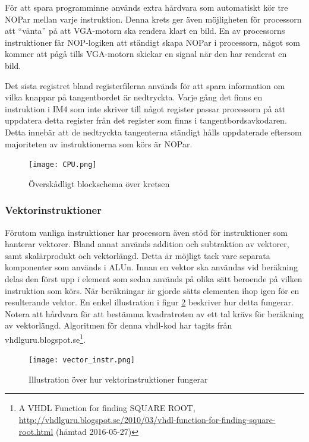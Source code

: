 \documentclass[a4paper]{article}
\begin{document}
	För att spara programminne används extra hårdvara som automatiskt kör tre NOPar 
	mellan varje instruktion. Denna krets ger även möjligheten för processorn att “vänta” 
	på att VGA-motorn ska rendera klart en bild. En av processorns instruktioner får 
	NOP-logiken att ständigt skapa NOPar i processorn, något som kommer att pågå tills 
	VGA-motorn skickar en signal när den har renderat en bild.

	Det sista registret bland registerfilerna används för att spara information om vilka 
	knappar på tangentbordet är nedtryckta. Varje gång det finns en instruktion i IM4 som 
	inte skriver till något register passar processorn på att uppdatera detta register 
	från det register som finns i tangentbordsavkodaren. Detta innebär att de nedtryckta 
	tangenterna ständigt hålls uppdaterade eftersom majoriteten av instruktionerna som körs 
	är NOPar.

	\begin{figure}[H]
        \centering
        \texttt{[image: CPU.png]}
        \caption{Överskådligt blockschema över kretsen}
        \label{fig:cpu}
    \end{figure}
	
	\subsubsection{Vektorinstruktioner}
	Förutom vanliga instruktioner har processorn även stöd för instruktioner som hanterar 
	vektorer. Bland annat används addition och subtraktion av vektorer, samt skalärprodukt 
	och vektorlängd. Detta är möjligt tack vare separata komponenter som används i ALUn. 
	Innan en vektor ska användas vid beräkning delas den först upp i element som sedan används 
	på olika sätt beroende på vilken instruktion som körs. När beräkningar är gjorde sätts 
	elementen ihop igen för en resulterande vektor. En enkel illustration i figur \ref{fig:vector_instr} beskriver 
	hur detta fungerar. Notera att hårdvara för att bestämma kvadratroten av ett tal krävs för beräkning av vektorlängd. 
	Algoritmen för denna vhdl-kod har tagits från vhdlguru.blogspot.se\footnote{A VHDL Function for finding SQUARE ROOT, \url{http://vhdlguru.blogspot.se/2010/03/vhdl-function-for-finding-square-root.html} (hämtad 2016-05-27)}.

    \begin{figure}[H]
        \centering
        \texttt{[image: vector\_instr.png]}
        \caption{Illustration över hur vektorinstruktioner fungerar}
        \label{fig:vector_instr}
    \end{figure}
\end{document}
